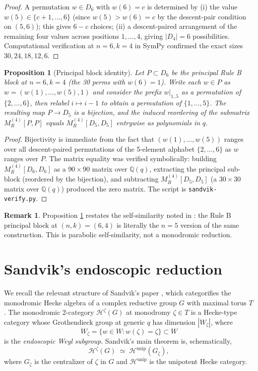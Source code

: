 \documentclass[11pt]{article}
\newtheorem{proposition}[theorem]{Proposition}
\theoremstyle{definition}
\newtheorem{remark}[theorem]{Remark}
\begin{document}
\begin{proof}
A permutation $w \in D_6$ with $w(6)=c$ is determined by (i) the value $w(5) \in \{c+1, \ldots, 6\}$ (since $w(5)>w(6)=c$ by the descent-pair condition on $(5,6)$); this gives $6-c$ choices; (ii) a descent-paired arrangement of the remaining four values across positions $1,\ldots,4$, giving $|D_4| = 6$ possibilities. Computational verification at $n=6, k=4$ in SymPy confirmed the exact sizes $30, 24, 18, 12, 6$.
\end{proof}

\begin{proposition}[Principal block identity]\label{prop:principal}
Let $P \subset D_6$ be the principal Rule B block at $n=6, k=4$ (the 30 perms with
$w(6)=1$). Write each $w \in P$ as $w = (w(1),\ldots,w(5), 1)$ and consider the
prefix $w|_{1..5}$ as a permutation of $\{2,\ldots,6\}$, then relabel
$i \mapsto i-1$ to obtain a permutation of $\{1,\ldots,5\}$. The resulting map
$P \to D_5$ is a bijection, and the induced reordering of the submatrix
$M_R^{(4)}[P, P]$ equals $M_R^{(4)}[D_5, D_5]$ entrywise as polynomials in $q$.
\end{proposition}

\begin{proof}
Bijectivity is immediate from the fact that $(w(1),\ldots,w(5))$ ranges over all
descent-paired permutations of the 5-element alphabet $\{2,\ldots,6\}$ as $w$ ranges
over $P$. The matrix equality was verified symbolically: building
$M_R^{(4)}[D_6, D_6]$ as a $90\times 90$ matrix over $\mathbb{Q}(q)$, extracting
the principal sub-block (reordered by the bijection), and subtracting
$M_R^{(4)}[D_5, D_5]$ (a $30 \times 30$ matrix over $\mathbb{Q}(q)$) produced the zero
matrix. The script is \texttt{sandvik-verify.py}.
\end{proof}

\begin{remark}
Proposition \ref{prop:principal} restates the self-similarity noted in \cite{memory:block-decomposition-rule-b}: the Rule B principal block at $(n, k) = (6, 4)$ is literally the $n=5$ version of the same construction. This is parabolic self-similarity, not a monodromic reduction.
\end{remark}

\section{Sandvik's endoscopic reduction}

We recall the relevant structure of Sandvik's paper \cite{sandvik}, which
categorifies the monodromic Hecke algebra of a complex reductive group $G$ with
maximal torus $T$. The monodromic 2-category $\mathcal{H}^\zeta(G)$ at monodromy
$\zeta \in T$ is a Hecke-type category whose Grothendieck group at generic $q$ has
dimension $|W_\zeta|$, where
$$W_\zeta = \{w \in W : w(\zeta) = \zeta\} \subset W$$
is the \emph{endoscopic Weyl subgroup}. Sandvik's main theorem is, schematically,
$$\mathcal{H}^\zeta(G) \;\simeq\; \mathcal{H}^{\text{unip}}(G_\zeta),$$
where $G_\zeta$ is the centralizer of $\zeta$ in $G$ and $\mathcal{H}^{\text{unip}}$
is the unipotent Hecke category.
\end{document}
